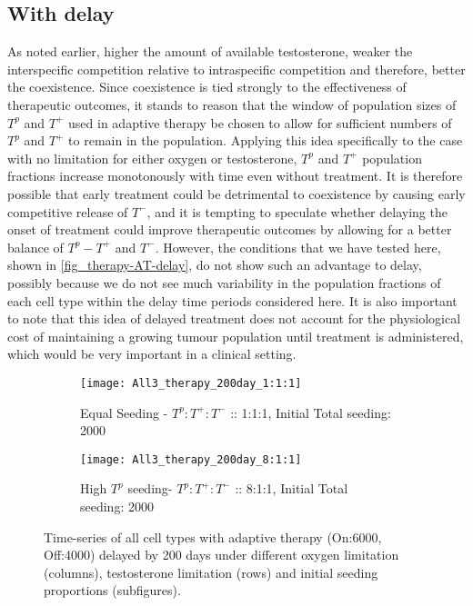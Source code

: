\clearpage

\subsection{With delay}
As noted earlier, higher the amount of available testosterone, weaker the interspecific competition relative to intraspecific competition and therefore, better the coexistence. Since coexistence is tied strongly to the effectiveness of therapeutic outcomes, it stands to reason that the window of population sizes of $T^p$ and $T^+$ used in adaptive therapy be chosen to allow for sufficient numbers of $T^p$ and $T^+$ to remain in the population. Applying this idea specifically to the case with no limitation for either oxygen or testosterone, $T^p$ and $T^+$ population fractions increase monotonously with time even without treatment. It is therefore possible that early treatment could be detrimental to coexistence by causing early competitive release of $T^-$, and it is tempting to speculate whether delaying the onset of treatment could improve therapeutic outcomes by allowing for a better balance of $T^p - T^+$ and $T^-$. However, the conditions that we have tested here, shown in \autoref{fig_therapy-AT-delay}, do not show such an advantage to delay, possibly because we do not see much variability in the population fractions of each cell type within the delay time periods considered here. It is also important to note that this idea of delayed treatment does not account for the physiological cost of maintaining a growing tumour population until treatment is administered, which would be very important in a clinical setting.

\begin{figure}[h!]
  \centering
  \begin{subfigure}[b]{\textwidth}
    \centering
    \texttt{[image: All3\_therapy\_200day\_1:1:1]}
    \caption{Equal Seeding - $T^p:T^+:T^-$ :: 1:1:1, Initial Total seeding: 2000}
    \label{fig_therapy-AT-delay200_1:1:1-2000}
  \end{subfigure}
  \begin{subfigure}[b]{\textwidth}
    \centering
    \texttt{[image: All3\_therapy\_200day\_8:1:1]}
    \caption{High $T^p$ seeding- $T^p:T^+:T^-$ :: 8:1:1, Initial Total seeding: 2000}
    \label{fig_therapy-AT-delay200_8:1:1-2000}
  \end{subfigure}
  \caption[Time-series of all cell types with delayed adaptive therapy]{Time-series of all cell types with adaptive therapy (On:6000, Off:4000) delayed by 200 days under different oxygen limitation (columns), testosterone limitation (rows) and initial seeding proportions (subfigures).}
  \label{fig_therapy-AT-delay}
\end{figure}

